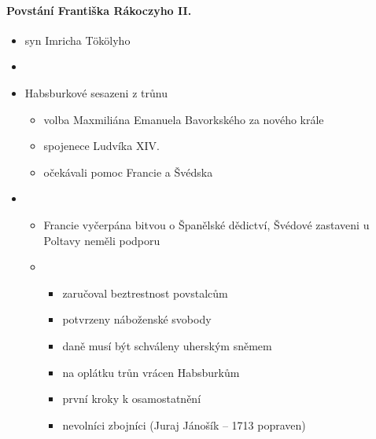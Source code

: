 \paragraph{Povstání Františka Rákoczyho II.}
\begin{itemize}
\item syn Imricha Tökölyho
\item {}
\item Habsburkové sesazeni z trůnu
	\begin{itemize}
	\item volba Maxmiliána Emanuela Bavorkského za nového krále
	\item spojenece Ludvíka XIV.
	\item očekávali pomoc Francie a Švédska
	\end{itemize}
\item {}
	\begin{itemize}
	\item Francie vyčerpána bitvou o Španělské dědictví, Švédové zastaveni u Poltavy \ra neměli podporu
	\item {}
		\begin{itemize}
		\item zaručoval beztrestnost povstalcům
		\item potvrzeny náboženské svobody
		\item daně musí být schváleny uherským sněmem
		\item na oplátku trůn vrácen Habsburkům
		\item první kroky k osamostatnění
		\item nevolníci \ra zbojníci (Juraj Jánošík -- 1713 popraven)
		\end{itemize}
	\end{itemize}
\end{itemize}






\timeline
